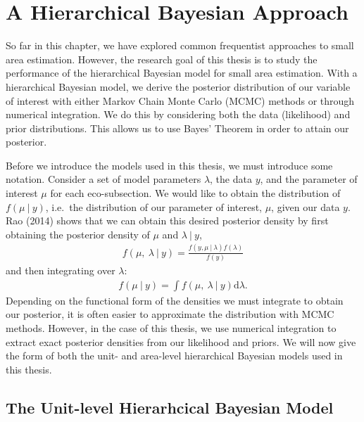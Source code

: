 \documentclass[12pt,twoside]{reedthesis}
\begin{document}
\hypertarget{a-hierarchical-bayesian-approach}{%
\section{A Hierarchical Bayesian Approach}\label{a-hierarchical-bayesian-approach}}

So far in this chapter, we have explored common frequentist approaches to small area estimation. However, the research goal of this thesis is to study the performance of the hierarchical Bayesian model for small area estimation. With a hierarchical Bayesian model, we derive the posterior distribution of our variable of interest with either Markov Chain Monte Carlo (MCMC) methods or through numerical integration. We do this by considering both the data (likelihood) and prior distributions. This allows us to use Bayes' Theorem in order to attain our posterior.

Before we introduce the models used in this thesis, we must introduce some notation. Consider a set of model parameters \(\lambda\), the data \(y\), and the parameter of interest \(\mu\) for each eco-subsection. We would like to obtain the distribution of \(f(\mu ~\vert~ y)\), i.e.~the distribution of our parameter of interest, \(\mu\), given our data \(y\). Rao (2014) shows that we can obtain this desired posterior density by first obtaining the posterior density of \(\mu\) and \(\lambda ~\vert~ y\),
\begin{align}
f(\mu,~ \lambda ~\vert~ y) = \frac{f(y, \mu ~\vert~ \lambda) f(\lambda)}{f(y)}
\end{align}
and then integrating over \(\lambda\):
\begin{align}
f(\mu ~\vert~ y) = \int f(\mu,~ \lambda ~\vert~ y) \text{d}\lambda.
\end{align}
Depending on the functional form of the densities we must integrate to obtain our posterior, it is often easier to approximate the distribution with MCMC methods. However, in the case of this thesis, we use numerical integration to extract exact posterior densities from our likelihood and priors. We will now give the form of both the unit- and area-level hierarchical Bayesian models used in this thesis.

\hypertarget{the-unit-level-hierarhcical-bayesian-model}{%
\subsection{The Unit-level Hierarhcical Bayesian Model}\label{the-unit-level-hierarhcical-bayesian-model}}
\end{document}
